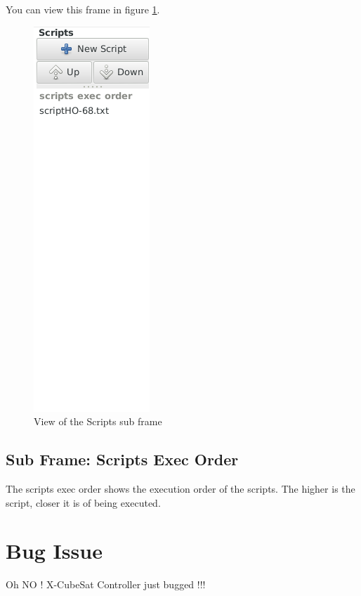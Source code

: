 \documentclass[pdftex,11pt,a4paper,titlepage]{report}
\begin{document}
You can view this frame in figure \ref{ScriptsFrame}.
\begin{figure}[h]
\centering
\includegraphics[scale=0.6]{../images/ScriptsFrame.png}
\caption{View of the Scripts sub frame}
\label{ScriptsFrame}
\end{figure}
\section{Sub Frame: Scripts Exec Order}
The scripts exec order shows the execution order of the scripts. The higher is the script, closer it is of being executed.

\chapter{Bug Issue}
\begin{framed}
Oh NO ! X-CubeSat Controller just bugged !!!
\end{framed} 
\end{document}
